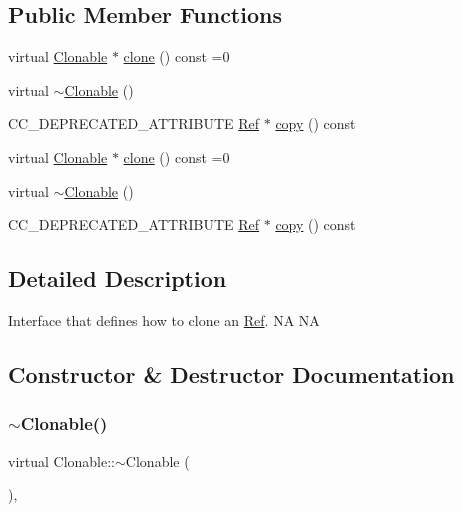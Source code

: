 \subsection*{Public Member Functions}
\begin{DoxyCompactItemize}
\item 
virtual \hyperlink{classClonable}{Clonable} $\ast$ \hyperlink{classClonable_a36b05a0fa605f4f269e5884bde7f9e0c}{clone} () const =0
\item 
virtual \hyperlink{classClonable_a2b9c911b4a49b532da3dea9951cf5fac}{$\sim$\+Clonable} ()
\item 
C\+C\+\_\+\+D\+E\+P\+R\+E\+C\+A\+T\+E\+D\+\_\+\+A\+T\+T\+R\+I\+B\+U\+TE \hyperlink{classRef}{Ref} $\ast$ \hyperlink{classClonable_a5fd8dad9fd4321a1372423892e16dad8}{copy} () const
\item 
virtual \hyperlink{classClonable}{Clonable} $\ast$ \hyperlink{classClonable_a36b05a0fa605f4f269e5884bde7f9e0c}{clone} () const =0
\item 
virtual \hyperlink{classClonable_a2b9c911b4a49b532da3dea9951cf5fac}{$\sim$\+Clonable} ()
\item 
C\+C\+\_\+\+D\+E\+P\+R\+E\+C\+A\+T\+E\+D\+\_\+\+A\+T\+T\+R\+I\+B\+U\+TE \hyperlink{classRef}{Ref} $\ast$ \hyperlink{classClonable_a5fd8dad9fd4321a1372423892e16dad8}{copy} () const
\end{DoxyCompactItemize}


\subsection{Detailed Description}
Interface that defines how to clone an \hyperlink{classRef}{Ref}.  NA  NA 

\subsection{Constructor \& Destructor Documentation}
\mbox{\label{classClonable_a2b9c911b4a49b532da3dea9951cf5fac}} 
\subsubsection{\texorpdfstring{$\sim$\+Clonable()}{~Clonable()}\hspace{0.1cm}{\footnotesize\ttfamily [1/2]}}
{\footnotesize\ttfamily virtual Clonable\+::$\sim$\+Clonable (\begin{DoxyParamCaption}{ }\end{DoxyParamCaption})\hspace{0.3cm}{\ttfamily [inline]}, {\ttfamily [virtual]}}


